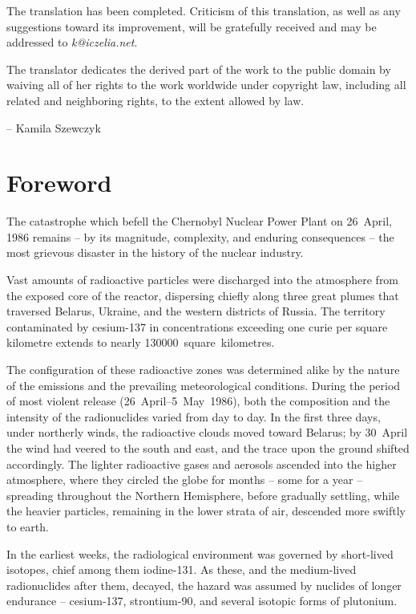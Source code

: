 \documentclass[openright]{bookest}
\begin{document}
The translation has been completed. Criticism of this translation, as well as any suggestions toward its improvement, will be gratefully received and may be addressed to \textit{k@iczelia.net}.

The translator dedicates the derived part of the work to the public domain by waiving all of her rights to the work worldwide under copyright law, including all related and neighboring rights, to the extent allowed by law.

\begin{flushright}\small{
-- Kamila Szewczyk
}\end{flushright}

\chapter*{Foreword}

The catastrophe which befell the Chernobyl Nuclear Power Plant on 26~April, 1986 remains -- by its magnitude, complexity, and enduring consequences -- the most grievous disaster in the history of the nuclear industry.

Vast amounts of radioactive particles were discharged into the atmosphere from the exposed core of the reactor, dispersing chiefly along three great plumes that traversed Belarus, Ukraine, and the western districts of Russia. The territory contaminated by cesium-137 in concentrations exceeding one curie per square kilometre extends to nearly \num{130000}~square~kilometres.

The configuration of these radioactive zones was determined alike by the nature of the emissions and the prevailing meteorological conditions. During the period of most violent release (26~April--5~May~1986), both the composition and the intensity of the radionuclides varied from day to day. In the first three days, under northerly winds, the radioactive clouds moved toward Belarus; by 30~April the wind had veered to the south and east, and the trace upon the ground shifted accordingly. The lighter radioactive gases and aerosols ascended into the higher atmosphere, where they circled the globe for months -- some for a year -- spreading throughout the Northern Hemisphere, before gradually settling, while the heavier particles, remaining in the lower strata of air, descended more swiftly to earth.

In the earliest weeks, the radiological environment was governed by short-lived isotopes, chief among them iodine-131. As these, and the medium-lived radionuclides after them, decayed, the hazard was assumed by nuclides of longer endurance -- cesium-137, strontium-90, and several isotopic forms of plutonium.
\end{document}
